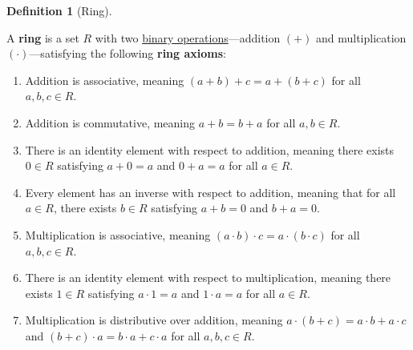 \documentclass{scrartcl}
\theoremstyle{definition}
\newtheorem{definition}{Definition}[section]
\theoremstyle{plain}
\theoremstyle{remark}
\begin{document}
\begin{definition}[Ring]
    \label{def:ring}

    A \textbf{ring} is a set $R$ with two \hyperref[def:binary operation]{binary operations}---addition $(+)$ and
    multiplication $(\cdot)$---satisfying the following \textbf{ring axioms}:
    \begin{enumerate}
        \item Addition is associative, meaning $(a+b)+c=a+(b+c)$ for all $a,b,c\in R$.
        \item Addition is commutative, meaning $a+b=b+a$ for all $a,b\in R$.

        \item
            There is an identity element with respect to addition, meaning there exists $0\in R$ satisfying $a+0=a$ and
            $0+a=a$ for all $a\in R$.

        \item
            Every element has an inverse with respect to addition, meaning that for all $a\in R$, there exists $b\in R$
            satisfying $a+b=0$ and $b+a=0$.

        \item Multiplication is associative, meaning $(a\cdot b)\cdot c=a\cdot (b\cdot c)$ for all $a,b,c\in R$.

        \item
            There is an identity element with respect to multiplication, meaning there exists $1\in R$ satisfying
            $a\cdot 1=a$ and $1\cdot a=a$ for all $a\in R$.

        \item
            Multiplication is distributive over addition, meaning $a\cdot (b+c)=a\cdot b+a\cdot c$ and
            $(b+c)\cdot a=b\cdot a+c\cdot a$ for all $a,b,c\in R$.
    \end{enumerate}
\end{definition}
\end{document}
